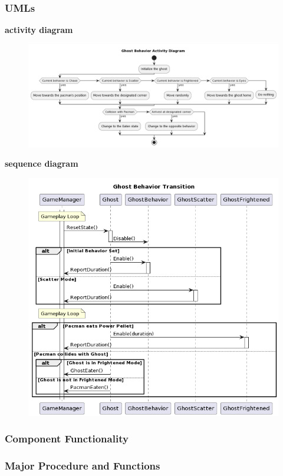 \documentclass[11pt]{article}
\begin{document}
\subsubsection{UMLs}
\textbf{activity diagram}\\
\begin{figure}[H]
    \centering
    \includegraphics*[scale=0.3]{Ghost_Activity.png}
\end{figure}
\textbf{sequence diagram}\\
\begin{figure}[H]
    \centering
    \includegraphics*[scale=0.4]{Ghost_Sequence.png}
\end{figure}
\subsubsection{Component Functionality}
\subsubsection{Major Procedure and Functions}
\end{document}
